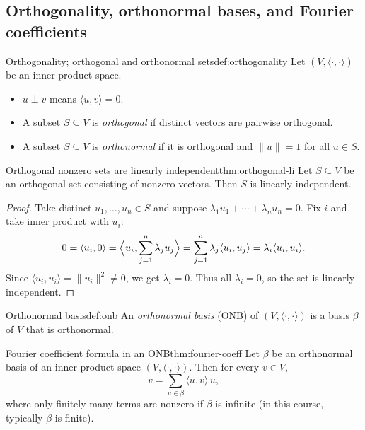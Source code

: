 \subsection{Orthogonality, orthonormal bases, and Fourier coefficients}

\begin{definition}{Orthogonality; orthogonal and orthonormal sets}{def:orthogonality}
Let $(V,\langle\cdot,\cdot\rangle)$ be an inner product space.
\begin{itemize}[leftmargin=*]
\item $u\perp v$ means $\langle u,v\rangle=0$.
\item A subset $S\subseteq V$ is \emph{orthogonal} if distinct vectors are pairwise orthogonal.
\item A subset $S\subseteq V$ is \emph{orthonormal} if it is orthogonal and $\|u\|=1$ for all $u\in S$.
\end{itemize}
\end{definition}

\begin{theorem}{Orthogonal nonzero sets are linearly independent}{thm:orthogonal-li}
Let $S\subseteq V$ be an orthogonal set consisting of nonzero vectors. Then $S$ is linearly independent.
\end{theorem}

\begin{proof}
Take distinct $u_1,\dots,u_n\in S$ and suppose $\lambda_1u_1+\cdots+\lambda_nu_n=0$.
Fix $i$ and take inner product with $u_i$:
\[
0=\langle u_i,0\rangle=\Bigl\langle u_i,\sum_{j=1}^n \lambda_j u_j\Bigr\rangle=\sum_{j=1}^n \lambda_j \langle u_i,u_j\rangle
=\lambda_i\langle u_i,u_i\rangle.
\]
Since $\langle u_i,u_i\rangle=\|u_i\|^2\neq 0$, we get $\lambda_i=0$.
Thus all $\lambda_i=0$, so the set is linearly independent.
\end{proof}

\begin{definition}{Orthonormal basis}{def:onb}
An \emph{orthonormal basis} (ONB) of $(V,\langle\cdot,\cdot\rangle)$ is a basis $\beta$ of $V$ that is orthonormal.
\end{definition}

\begin{theorem}{Fourier coefficient formula in an ONB}{thm:fourier-coeff}
Let $\beta$ be an orthonormal basis of an inner product space $(V,\langle\cdot,\cdot\rangle)$.
Then for every $v\in V$,
\[
v=\sum_{u\in\beta} \langle u,v\rangle\,u,
\]
where only finitely many terms are nonzero if $\beta$ is infinite (in this course, typically $\beta$ is finite).
\end{theorem}

